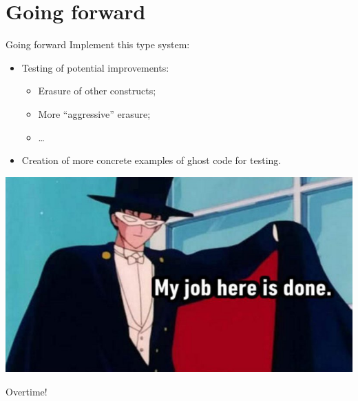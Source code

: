 \documentclass[aspectratio=169]{beamer}
\newcommand{\sectionimg}[0]{}
\renewcommand{\sectionimg}[0]{}
\let\sectionbase\section
\renewcommand{\section}[2][]{\renewcommand{\sectionimg}{#1}\sectionbase{#2}}
\begin{document}
\section{Going forward}
\begin{frame}{Going forward}
    Implement this type system:
    \begin{itemize}
        \item Testing of potential improvements:
        \begin{itemize}
            \item Erasure of other constructs;
            \item More ``aggressive'' erasure;
            \item \ldots
        \end{itemize} 
        \item Creation of more concrete examples of ghost code for testing. 
    \end{itemize}
\end{frame}

\begin{frame}{}
    \includegraphics[width=\textwidth]{imgs/job.jpg}
\end{frame}

\appendix
\begin{frame}[standout]
    Overtime!
\end{frame}
\end{document}
